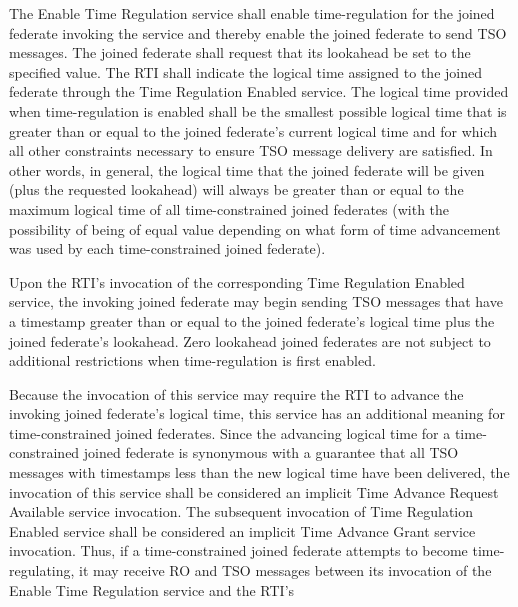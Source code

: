 \begin{compactstdpage}
    The Enable Time Regulation service shall enable time-regulation for the joined federate invoking the service and thereby enable the joined federate to send TSO messages. The joined federate shall request that its lookahead be set to the specified value. The RTI shall indicate the logical time assigned to the joined federate through the Time Regulation Enabled \rtiinitiated{} service. The logical time provided when time-regulation is enabled shall be the smallest possible logical time that is greater than or equal to the joined federate's current logical time and for which all other constraints necessary to ensure TSO message delivery are satisfied. In other words, in general, the logical time that the joined federate will be given (plus the requested lookahead) will always be greater than or equal to the maximum logical time of all time-constrained joined federates (with the possibility of being of equal value depending on what form of time advancement was used by each time-constrained joined federate).

    Upon the RTI's invocation of the corresponding Time Regulation Enabled \rtiinitiated{} service, the invoking joined federate may begin sending TSO messages that have a timestamp greater than or equal to the joined federate's logical time plus the joined federate's lookahead. Zero lookahead joined federates are not subject to additional restrictions when time-regulation is first enabled.

    Because the invocation of this service may require the RTI to advance the invoking joined federate's logical time, this service has an additional meaning for time-constrained joined federates. Since the advancing logical time for a time-constrained joined federate is synonymous with a guarantee that all TSO messages with timestamps less than the new logical time have been delivered, the invocation of this service shall be considered an implicit Time Advance Request Available service invocation. The subsequent invocation of Time Regulation Enabled \rtiinitiated{} service shall be considered an implicit Time Advance Grant \rtiinitiated{} service invocation. Thus, if a time-constrained joined federate attempts to become time-regulating, it may receive RO and TSO messages between its invocation of the Enable Time Regulation service and the RTI's


\end{compactstdpage}

\clearpage


